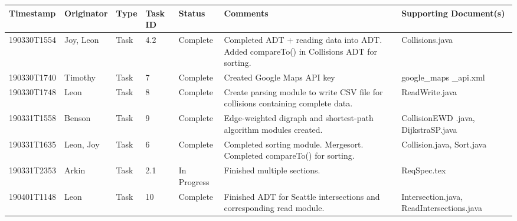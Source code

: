 \documentclass[12pt]{article}
\begin{document}
\begin{center}
    \begin{tabular}{| P{2.5cm} | P{2.2cm} | P{1.4cm} | P{0.9cm} | P{1.9cm} | P{2.8cm} | P{3cm} |}
        \hline
        \textbf{Timestamp} & \textbf{Originator} & \textbf{Type} 
        & \textbf{Task ID} & \textbf{Status} & \textbf{Comments} 
        & \textbf{Supporting Document(s)}\\
        \hline
        190330T1554 & Joy, Leon & Task & 4.2 & Complete & Completed ADT + reading data into ADT. Added compareTo() in Collisions ADT for sorting. & Collisions.java \\
        \hline
        190330T1740 & Timothy & Task & 7 & Complete & Created Google Maps API key & google\_maps \_api.xml\\
        \hline
        190330T1748 & Leon & Task & 8 & Complete & Create parsing module to write CSV file for collisions containing complete data. & ReadWrite.java\\
        \hline
        190331T1558 & Benson & Task & 9 & Complete & Edge-weighted digraph and shortest-path algorithm modules created. & CollisionEWD
        .java, DijkstraSP.java\\
        \hline
        190331T1635 & Leon, Joy & Task & 6 & Complete & Completed sorting module. Mergesort. Completed compareTo() for sorting. & Collision.java, 
        Sort.java\\
        \hline
        190331T2353 & Arkin & Task & 2.1 & In Progress & Finished multiple sections. & ReqSpec.tex\\
        \hline
        190401T1148 & Leon & Task & 10 & Complete & Finished ADT for Seattle intersections and corresponding read module. & Intersection.java, ReadIntersections.java\\
        \hline
    \end{tabular}
    

\end{center}
\end{document}
